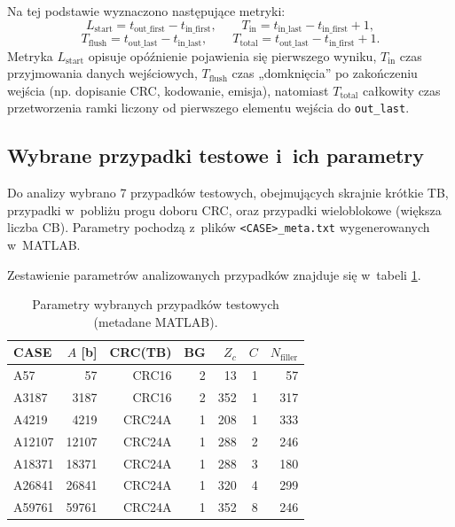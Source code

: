 Na tej podstawie wyznaczono następujące metryki:
\[
L_{\mathrm{start}} = t_{\mathrm{out\_first}} - t_{\mathrm{in\_first}},
\qquad
T_{\mathrm{in}} = t_{\mathrm{in\_last}} - t_{\mathrm{in\_first}} + 1,
\]
\[
T_{\mathrm{flush}} = t_{\mathrm{out\_last}} - t_{\mathrm{in\_last}},
\qquad
T_{\mathrm{total}} = t_{\mathrm{out\_last}} - t_{\mathrm{in\_first}} + 1.
\]
Metryka $L_{\mathrm{start}}$ opisuje opóźnienie pojawienia się pierwszego wyniku, $T_{\mathrm{in}}$ czas przyjmowania danych wejściowych,
$T_{\mathrm{flush}}$ czas „domknięcia” po zakończeniu wejścia (np. dopisanie CRC, kodowanie, emisja), natomiast $T_{\mathrm{total}}$ całkowity czas przetworzenia ramki
liczony od pierwszego elementu wejścia do \texttt{out\_last}.




\subsection{Wybrane przypadki testowe i~ich parametry}
\label{subsec:selected_cases_params}

Do analizy wybrano 7 przypadków testowych, obejmujących skrajnie krótkie TB, przypadki w~pobliżu progu doboru CRC,
oraz przypadki wieloblokowe (większa liczba CB). Parametry pochodzą z~plików \texttt{<CASE>\_meta.txt} wygenerowanych w~MATLAB.

Zestawienie parametrów analizowanych przypadków znajduje się w~tabeli \ref{tab:selected_cases_params}.

\begin{table}[!ht]
\centering
\caption{Parametry wybranych przypadków testowych (metadane MATLAB).}
\label{tab:selected_cases_params}
\begin{tabular}{lrrrrrr}
\hline
CASE & $A$ [b] & CRC(TB) & BG & $Z_c$ & $C$ & $N_\mathrm{filler}$ \\
\hline
A57     & 57     & CRC16  & 2 & 13  & 1 & 57  \\
A3187   & 3187   & CRC16  & 2 & 352 & 1 & 317 \\
A4219   & 4219   & CRC24A & 1 & 208 & 1 & 333 \\
A12107  & 12107  & CRC24A & 1 & 288 & 2 & 246 \\
A18371  & 18371  & CRC24A & 1 & 288 & 3 & 180 \\
A26841  & 26841  & CRC24A & 1 & 320 & 4 & 299 \\
A59761  & 59761  & CRC24A & 1 & 352 & 8 & 246 \\
\hline
\end{tabular}
\end{table}


